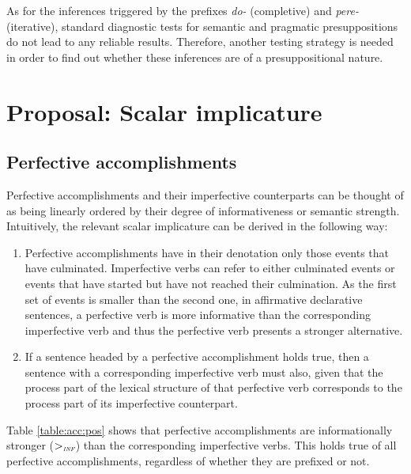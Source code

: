 As for the inferences triggered by the prefixes \textit{do-} (completive) and \textit{pere-} (iterative), standard diagnostic tests for semantic and pragmatic presuppositions do not lead to any reliable results. Therefore, another testing strategy is needed in order to find out whether these inferences are of a presuppositional nature. 

\section{Proposal: Scalar implicature}\label{sec:pragm:new}
\subsection{Perfective accomplishments}\label{sec:pragm:new:perf}
Perfective accomplishments and their imperfective counterparts can be thought of as being linearly ordered by their degree of informativeness or semantic strength.
Intuitively, the relevant scalar implicature can be derived in the following way:
\begin{enumerate}
\item
Perfective accomplishments have in their denotation only those events that have culminated. Imperfective verbs can refer to either culminated events or events that have started but have not reached their culmination. As the first set of events is smaller than the second one, in affirmative declarative sentences, a perfective verb is more informative than the corresponding imperfective verb and thus the perfective verb presents a stronger alternative.
\item If a sentence headed by a perfective accomplishment holds true, then a sentence with a corresponding imperfective verb must also, given that the process part of the lexical structure of that perfective verb corresponds to the process part of its imperfective counterpart.
\end{enumerate}
Table \ref{table:acc:pos} shows that perfective accomplishments are informationally stronger ($>_{\textit{\tiny INF}}$) than the corresponding imperfective verbs. This holds true of all perfective accomplishments, regardless of whether they are prefixed or not.


